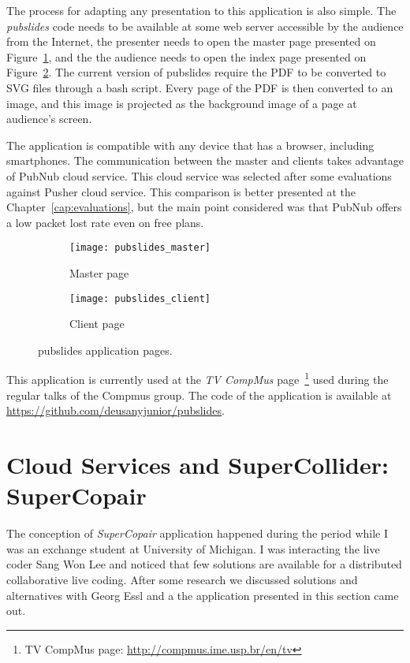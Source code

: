 The process for adapting any presentation to this application is also simple.
The \textit{pubslides} code needs to be available at some web server accessible by the audience from the Internet, the presenter needs to open the master page presented on Figure~\ref{fig:pubslidesmaster}, and the the audience needs to open the index page presented on Figure~\ref{fig:pubslidesclient}.
The current version of pubslides require the PDF to be converted to SVG files through a bash script.
Every page of the PDF is then converted to an image, and this image is projected as the background image of a page at audience's screen.

The application is compatible with any device that has a browser, including smartphones.
The communication between the master and clients takes advantage of PubNub cloud service.
This cloud service was selected after some evaluations against Pusher cloud service.
This comparison is better presented at the Chapter~\ref{cap:evaluations}, but the main point considered was that PubNub offers a low packet lost rate even on free plans.

\begin{figure*}[!ht]
\centering
\begin{subfigure}{.45\textwidth}
	\texttt{[image: pubslides\_master]}
    \caption{Master page}
	\label{fig:pubslidesmaster}
\end{subfigure}
\begin{subfigure}{.45\textwidth}
	\texttt{[image: pubslides\_client]}
	\caption{Client page}
	\label{fig:pubslidesclient}
\end{subfigure}

\caption{pubslides application pages.}
\label{fig:pubslidesapplication}
\end{figure*}


This application is currently used at the \textit{TV CompMus} page~\footnote{TV CompMus page: \url{http://compmus.ime.usp.br/en/tv}} used during the regular talks of the Compmus group.
The code of the application is available at \url{https://github.com/deusanyjunior/pubslides}.

\section{Cloud Services and SuperCollider: SuperCopair}
\label{sec:appsupercopair}

The conception of \textit{SuperCopair} application happened during the period while I was an exchange student at University of Michigan.
I was interacting the live coder Sang Won Lee and noticed that few solutions are available for a distributed collaborative live coding.
After some research we discussed solutions and alternatives with Georg Essl and a the application presented in this section came out.

